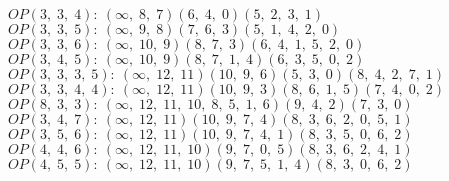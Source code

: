 
$OP(3, \;3, \;4): \:(\infty, \;8, \;7)(6, \;4, \;0)(5, \;2, \;3, \;1)$\\

$OP(3, \;3, \;5): \:(\infty, \;9, \;8)(7, \;6, \;3)(5, \;1, \;4, \;2, \;0)$\\

$OP(3, \;3, \;6): \:(\infty, \;10, \;9)(8, \;7, \;3)(6, \;4, \;1, \;5, \;2, \;0)$\\
$OP(3, \;4, \;5): \:(\infty, \;10, \;9)(8, \;7, \;1, \;4)(6, \;3, \;5, \;0, \;2)$\\

$OP(3, \;3, \;3, \;5): \:(\infty, \;12, \;11)(10, \;9, \;6)(5, \;3, \;0)(8, \;4, \;2, \;7, \;1)$\\
$OP(3, \;3, \;4, \;4): \:(\infty, \;12, \;11)(10, \;9, \;3)(8, \;6, \;1, \;5)(7, \;4, \;0, \;2)$\\
$OP(8, \;3, \;3): \:(\infty, \;12, \;11, \;10, \;8, \;5, \;1, \;6)(9, \;4, \;2)(7, \;3, \;0)$\\
$OP(3, \;4, \;7): \:(\infty, \;12, \;11)(10, \;9, \;7, \;4)(8, \;3, \;6, \;2, \;0, \;5, \;1)$\\
$OP(3, \;5, \;6): \:(\infty, \;12, \;11)(10, \;9, \;7, \;4, \;1)(8, \;3, \;5, \;0, \;6, \;2)$\\
$OP(4, \;4, \;6): \:(\infty, \;12, \;11, \;10)(9, \;7, \;0, \;5)(8, \;3, \;6, \;2, \;4, \;1)$\\
$OP(4, \;5, \;5): \:(\infty, \;12, \;11, \;10)(9, \;7, \;5, \;1, \;4)(8, \;3, \;0, \;6, \;2)$\\

